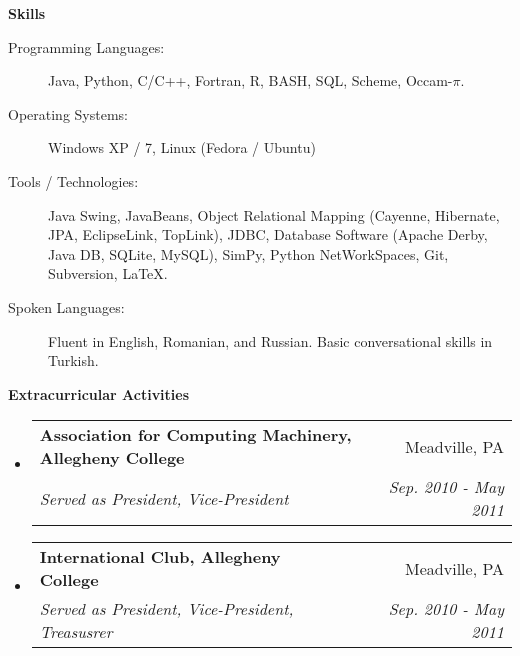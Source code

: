 \documentclass[letterpaper,12pt]{article}
\makeatletter
\newcommand{\resheading}[1]{{\large \colorbox{mygrey}{\begin{minipage}{\textwidth}{\textbf{#1 \vphantom{p\^{E}}}}\end{minipage}}}}
\newcommand{\ressubheading}[4]{
\begin{tabular*}{7.0in}{l@{\extracolsep{\fill}}r}
		\textbf{#1} & #2 \\
		\textit{#3} & \textit{#4} \\
\end{tabular*}\vspace{-6pt}}
\makeatother
\begin{document}
\pagebreak

\resheading{Skills}

\begin{description}
\item[Programming Languages:]
Java, Python, C/C++, Fortran, R, BASH, SQL, Scheme, Occam-$\pi$.
\item[Operating Systems:]
Windows XP / 7, Linux (Fedora / Ubuntu)
\item[Tools / Technologies:]
Java Swing, JavaBeans, Object Relational Mapping (Cayenne, Hibernate, JPA, EclipseLink, TopLink), JDBC, Database Software (Apache Derby, Java DB, SQLite, MySQL), SimPy, Python NetWorkSpaces, Git, Subversion, \LaTeX{}.
\item[Spoken Languages:]
Fluent in English, Romanian, and Russian. Basic conversational skills in Turkish.
\end{description}

\resheading{Extracurricular Activities}
\begin{itemize}
\item
	\ressubheading{Association for Computing Machinery, Allegheny College}{Meadville, PA}{Served as President, Vice-President}{Sep. 2010 - May 2011}
\item
	\ressubheading{International Club, Allegheny College}{Meadville, PA}{Served as President, Vice-President, Treasusrer}{Sep. 2010 - May 2011}
\end{itemize}
\end{document}
